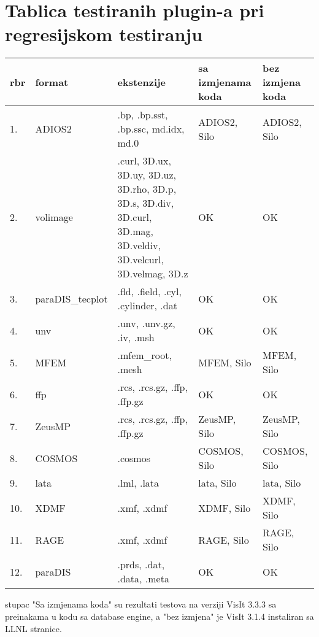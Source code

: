 \documentclass[times, utf8, zavrsni]{fer}
\begin{document}
\appendix
\chapter{Tablica testiranih plugin-a pri regresijskom testiranju}
\begin{longtable}{|l|p{70pt}|p{100pt}|p{100pt}| p{100pt}|}
	\hline
	\textbf{rbr} & \textbf{format} & \textbf{ekstenzije} & \textbf{sa izmjenama koda} & \textbf{bez izmjena koda}\\
	\hline
	\endhead %
	1. & ADIOS2 & .bp, .bp.sst, .bp.ssc, md.idx, md.0 & \cellcolor{yellow} ADIOS2, Silo & \cellcolor{yellow} ADIOS2, Silo\\
	\hline
	2. & volimage & .curl, 3D.ux, 3D.uy, 3D.uz, 3D.rho, 3D.p, 3D.s, 3D.div, 3D.curl, 3D.mag, 3D.veldiv, 3D.velcurl, 3D.velmag, 3D.z & \cellcolor{green} OK & \cellcolor{green}OK\\
	\hline
	3. & paraDIS\_tecplot & .fld, .field, .cyl, .cylinder, .dat & \cellcolor{green} OK & \cellcolor{green} OK\\
	\hline
	4. & unv & .unv, .unv.gz, .iv, .msh & \cellcolor{green} OK & \cellcolor{green} OK\\
	\hline
	5. & MFEM & .mfem\_root, .mesh & \cellcolor{yellow} MFEM, Silo & \cellcolor{yellow} MFEM, Silo\\
	\hline
	6. & ffp & .rcs, .rcs.gz, .ffp, .ffp.gz & \cellcolor{green} OK & \cellcolor{green} OK\\
	\hline
	7. & ZeusMP & .rcs, .rcs.gz, .ffp, .ffp.gz & \cellcolor{yellow} ZeusMP, Silo & \cellcolor{yellow} ZeusMP, Silo\\
	\hline
	8. & COSMOS & .cosmos & \cellcolor{yellow} COSMOS, Silo & \cellcolor{yellow} COSMOS, Silo\\
	\hline
	\hline
	9. & lata & .lml, .lata & \cellcolor{yellow} lata, Silo & \cellcolor{yellow} lata, Silo\\
	\hline
	10. & XDMF & .xmf, .xdmf & \cellcolor{yellow} XDMF, Silo & \cellcolor{yellow} XDMF, Silo\\
	\hline
	11. & RAGE & .xmf, .xdmf & \cellcolor{yellow} RAGE, Silo & \cellcolor{yellow} RAGE, Silo\\
	\hline
	12. & paraDIS & .prds, .dat, .data, .meta & \cellcolor{green} OK & \cellcolor{green} OK \\
	\hline
\end{longtable}

	stupac "Sa izmjenama koda" su rezultati testova na verziji VisIt 3.3.3 sa preinakama u kodu sa database engine, a "bez izmjena" je VisIt 3.1.4 instaliran sa LLNL stranice.
\end{document}
